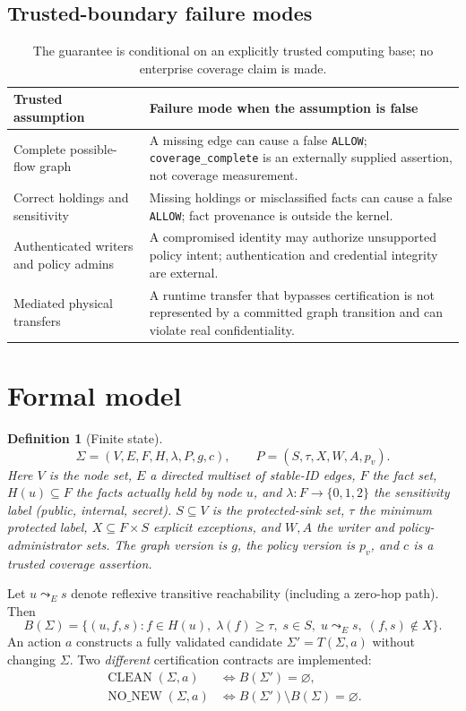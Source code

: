 \documentclass[11pt,letterpaper]{article}
\newtheorem{definition}{Definition}
\begin{document}
\subsection*{Trusted-boundary failure modes}
\begin{table}[H]
\centering\footnotesize
\begin{tabularx}{\linewidth}{@{}p{.23\linewidth}X@{}}\toprule
Trusted assumption & Failure mode when the assumption is false\\\midrule
Complete possible-flow graph & A missing edge can cause a false \texttt{ALLOW}; \texttt{coverage\_complete} is an externally supplied assertion, not coverage measurement.\\
Correct holdings and sensitivity & Missing holdings or misclassified facts can cause a false \texttt{ALLOW}; fact provenance is outside the kernel.\\
Authenticated writers and policy admins & A compromised identity may authorize unsupported policy intent; authentication and credential integrity are external.\\
Mediated physical transfers & A runtime transfer that bypasses certification is not represented by a committed graph transition and can violate real confidentiality.\\\bottomrule
\end{tabularx}
\caption{The guarantee is conditional on an explicitly trusted computing base; no enterprise coverage claim is made.}
\end{table}
\section{Formal model}
\begin{definition}[Finite state]
\begin{equation}\label{eq:model}\Sigma=(V,E,F,H,\lambda,P,g,c), \qquad P=(S,\tau,X,W,A,p_v).\end{equation}
Here $V$ is the node set, $E$ a directed multiset of stable-ID edges, $F$ the fact set, $H(u)\subseteq F$ the facts \emph{actually held} by node $u$, and $\lambda:F\to\{0,1,2\}$ the sensitivity label (public, internal, secret). $S\subseteq V$ is the protected-sink set, $\tau$ the minimum protected label, $X\subseteq F\times S$ explicit exceptions, and $W,A$ the writer and policy-administrator sets. The graph version is $g$, the policy version is $p_v$, and $c$ is a trusted coverage assertion.
\end{definition}
\noindent Let $u\leadsto_E s$ denote reflexive transitive reachability (including a zero-hop path). Then
\begin{equation}
B(\Sigma)=\{(u,f,s): f\in H(u),\; \lambda(f)\ge\tau,\; s\in S,\; u\leadsto_E s,\; (f,s)\notin X\}. \label{eq:bad}
\end{equation}
\noindent An action $a$ constructs a fully validated candidate $\Sigma'=T(\Sigma,a)$ without changing $\Sigma$. Two \emph{different} certification contracts are implemented:
\begin{align}
\operatorname{CLEAN}(\Sigma,a) &\iff B(\Sigma')=\varnothing, \label{eq:clean}\\
\operatorname{NO\_NEW}(\Sigma,a) &\iff B(\Sigma')\setminus B(\Sigma)=\varnothing. \label{eq:nonew}
\end{align}
\end{document}
